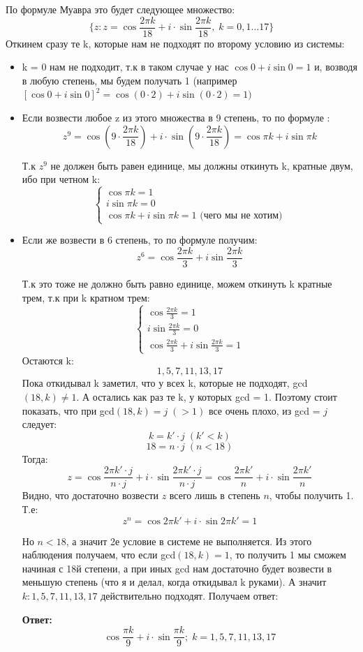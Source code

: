 \documentclass[a4paper,12pt]{article}
\begin{document}
\quad По формуле Муавра это будет следующее множество:
\[
\{ z : z = \cos \frac{2\pi  k}{18} + i \cdot \sin \frac{2  \pi k}{18}, \; k = 0, 1 \ldots 17\}
\]
Откинем сразу те k, которые нам не подходят по второму условию из системы:
\begin{itemize}
\item 
\quad k = 0 нам не подходит, т.к в таком случае у нас $\cos 0 + i \sin 0 = 1$ и, возводя в любую степень, мы  будем получать 1 (например $[\cos 0 + i \sin 0]^2 = \cos (0 \cdot 2 )+ i \sin (0 \cdot 2) = 1) $

\item
\quad Если возвести любое  z из этого множества в 9 степень, то по формуле :
\[
z^9 = \cos \left(9 \cdot \frac{2\pi k}{18} \right) + i \cdot \sin \left( 9 \cdot \frac{2 \pi k}{18} \right) = \cos \pi k + i \sin \pi k
\]

Т.к $z^9$ не должен быть равен единице, мы должны откинуть k, кратные двум, ибо при четном k:
\[
\begin{cases}
\cos \pi k = 1 \\
i \sin \pi k = 0 \\
\cos \pi k + i \sin \pi k = 1 \text{ (чего мы не хотим)}
\end{cases}
\]

\item
\quad Если же возвести в 6 степень, то по формуле получим:
\[
z^6 =\cos \frac{2\pi k}{3} + i \sin \frac{2\pi k}{3}
\]

Т.к это тоже не должно быть равно единице, можем откинуть k кратные трем, т.к при k кратном трем:
\[
\begin{cases}
\cos \frac{2\pi k}{3} = 1 \\
i \sin \frac{2\pi k}{3} = 0  \\
\cos \frac{2\pi k}{3} + i \sin \frac{2\pi k}{3} = 1
\end{cases}
\]
Остаются k:
\[
1, 5, 7, 11, 13, 17 
\]
Пока откидывал k заметил, что у всех k, которые не подходят, gcd$(18, k) \neq 1$. А остались как раз те k, у которых gcd = 1. Поэтому стоит показать, что при gcd$(18, k) = j \;(>1)$ все очень плохо, из gcd = $j$ следует:
\[
k = k' \cdot j \; (k' < k)
\]
\[
18 = n \cdot j \; (n < 18)
\]
Тогда:
\[
z = \cos \frac{2 \pi k' \cdot j}{n \cdot j } + i \cdot \sin \frac{2\pi k' \cdot j}{n \cdot j} = \cos \frac{2 \pi k' }{n} + i \cdot \sin \frac{2\pi k' }{n}
\]
Видно, что достаточно возвести $z$ всего лишь в степень $n$, чтобы получить 1. Т.е:
\[
z^n = \cos 2 \pi k'+ i \cdot \sin 2\pi k' = 1
\]

Но $n < 18$, а значит 2е условие в системе не выполняется. Из этого наблюдения получаем, что если gcd$(18, k) = 1$, то получить 1 мы сможем начиная с 18й степени, а при иных gcd нам достаточно будет возвести в меньшую степень (что я и делал, когда откидывал k руками). А значит$k : {1, 5, 7, 11, 13, 17}$ действительно подходят. Получаем ответ:
{\large \begin{center}
\textbf{Ответ: } 
\[
\cos \frac{\pi  k}{9} + i \cdot \sin \frac{ \pi k}{9}; \; k = 1, 5, 7, 11, 13, 17
\]
\end{center}}
\end{itemize}
\clearpage
\end{document}
